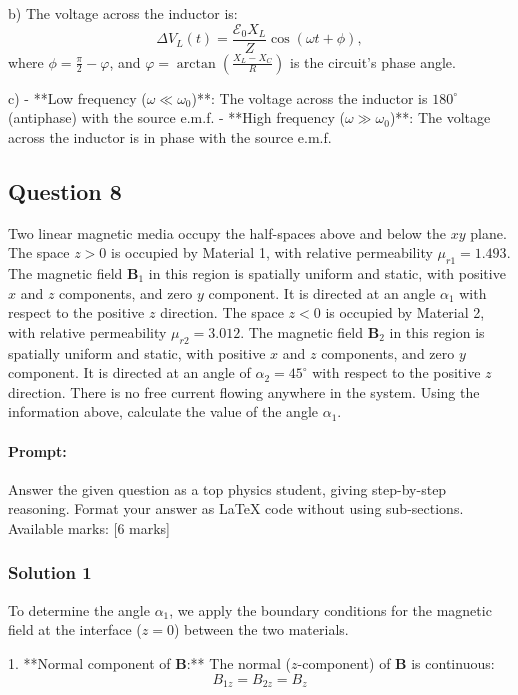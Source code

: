 \documentclass{article}
\begin{document}
b) The voltage across the inductor is:
\[
\Delta V_L(t) = \frac{\mathcal{E}_0 X_L}{Z} \cos\left(\omega t + \phi\right),
\]
where \( \phi = \frac{\pi}{2} - \varphi \), and \( \varphi = \arctan\left(\frac{X_L - X_C}{R}\right) \) is the circuit's phase angle.

c) 
- **Low frequency (\( \omega \ll \omega_0 \))**: The voltage across the inductor is \( 180^\circ \) (antiphase) with the source e.m.f.
- **High frequency (\( \omega \gg \omega_0 \))**: The voltage across the inductor is in phase with the source e.m.f.


\subsection{Question 8}
 Two linear magnetic media occupy the half-spaces above and below the $xy$ plane. The space $z > 0$ is occupied by Material 1, with relative permeability $\mu_{r1} = 1.493$. The magnetic field $\mathbf{B}_1$ in this region is spatially uniform and static, with positive $x$ and $z$ components, and zero $y$ component. It is directed at an angle $\alpha_1$ with respect to the positive $z$ direction. The space $z < 0$ is occupied by Material 2, with relative permeability $\mu_{r2} = 3.012$. The magnetic field $\mathbf{B}_2$ in this region is spatially uniform and static, with positive $x$ and $z$ components, and zero $y$ component. It is directed at an angle of $\alpha_2 = 45^\circ$ with respect to the positive $z$ direction. There is no free current flowing anywhere in the system. Using the information above, calculate the value of the angle $\alpha_1$.

\paragraph{Prompt: \\} 
Answer the given question as a top physics student, giving step-by-step reasoning. Format your answer as LaTeX code without using sub-sections. Available marks: [6 marks]

\subsubsection{Solution 1}
To determine the angle \(\alpha_1\), we apply the boundary conditions for the magnetic field at the interface (\(z = 0\)) between the two materials. 

1. **Normal component of \(\mathbf{B}\):**  
   The normal (\(z\)-component) of \(\mathbf{B}\) is continuous:  
   \[
   B_{1z} = B_{2z} = B_z
   \]
\end{document}
